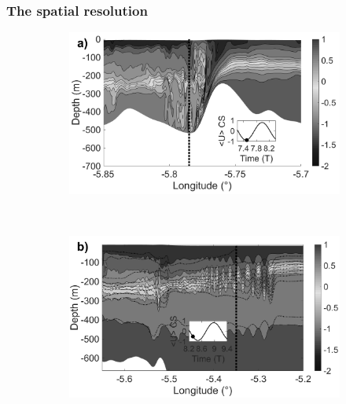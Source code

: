 \documentclass[a4paper,12pt]{article}
\begin{document}
\subsubsection{The spatial resolution}%

\begin{figure}[!t]
   
  \begin{subfigure}{0.5\linewidth}
  \includegraphics[width=\textwidth]{RW_J3_21h_50mtvd.png}
  \end{subfigure}
  ~
  \begin{subfigure}{0.5\linewidth}
  \includegraphics[width=\textwidth]{RW_J4_7h15train_50mtvd.png}
  \end{subfigure}
  

\end{figure}
\end{document}
